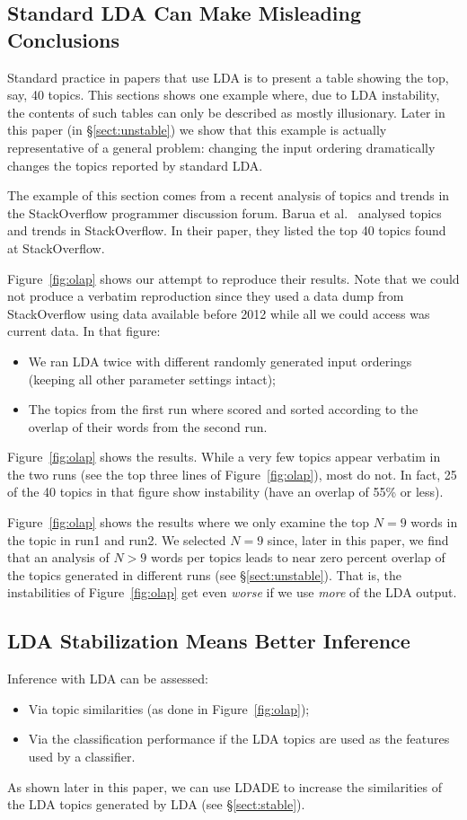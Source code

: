 \documentclass[twocolumn,5p,sort&compress]{elsarticle}
\newcommand{\tion}[1]{{\S}\ref{sect:#1}}
\newcommand{\fig}[1]{Figure~\ref{fig:#1}}
\newcommand{\bi}{\begin{itemize}}
\newcommand{\ei}{\end{itemize}}
\theoremstyle{break}
\begin{document}
\subsection{Standard LDA Can Make Misleading Conclusions}
Standard practice in papers that use LDA is to present a table showing the top, say, 40
topics.
This sections shows one example where, due to LDA instability,
the contents of such tables can only be described as  mostly illusionary.
Later in this paper (in \tion{unstable}) we show that this example is actually representative of
a general problem: changing the input ordering dramatically changes the topics
reported by standard LDA.

The example of this section comes from a recent analysis
of topics and trends in the StackOverflow programmer discussion forum.
Barua et al.~\cite{barua2014developers}
analysed topics and trends in StackOverflow. In their paper,
they listed the top
40 topics found at StackOverflow.

\fig{olap} shows our attempt to reproduce their results.
Note that we could not produce a verbatim reproduction since
they used a 
data dump from
StackOverflow using data available before 2012 while all we could access was current data.
In that figure:
\bi
\item
  We ran LDA twice with different
randomly generated input orderings (keeping all other parameter settings intact);
\item
  The topics from the first run where scored and sorted
according to the overlap of their words
from the second run.
\ei
\fig{olap} shows the results.
While
a very few topics appear verbatim in the two runs (see the top three lines of \fig{olap}),
most do not. In fact,
25 of the 40 topics in that figure show  instability (have an overlap of 55\% or less).

\fig{olap} shows the results where we only
examine the top $N=9$ words in the topic in run1 and run2. We selected $N=9$ since,
later in this paper, we find that an analysis of $N>9$ words per topics leads to near
 zero percent overlap of the topics generated in different runs (see \tion{unstable}).
That is, the instabilities of \fig{olap} get even {\em worse} if we use {\em more} of the LDA output.

\subsection{LDA Stabilization Means Better Inference}

Inference with LDA can be assessed:
\bi
\item
Via topic similarities (as done in \fig{olap});
\item
Via the classification performance if the LDA topics are used as the features used by a classifier.
\ei
As shown later in this paper, we can use LDADE to increase the similarities of the LDA
topics generated by LDA (see \tion{stable}).
\end{document}
